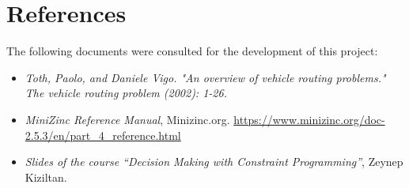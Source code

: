 \documentclass[main.tex]{subfiles}
\begin{document}
\section{References}
\label{sec:references}

The following documents were consulted for the development of this project:
\begin{itemize}
    \item \textit{Toth, Paolo, and Daniele Vigo. "An overview of vehicle routing problems." The vehicle routing problem (2002): 1-26.}
    \item \textit{MiniZinc Reference Manual}, Minizinc.org. \href{https://www.minizinc.org/doc-2.5.3/en/part_4_reference.html}{https://www.minizinc.org/doc-2.5.3/en/part\_4\_reference.html}
    \item \textit{Slides of the course ``Decision Making with Constraint Programming''}, Zeynep Kiziltan.
\end{itemize}
\end{document}
